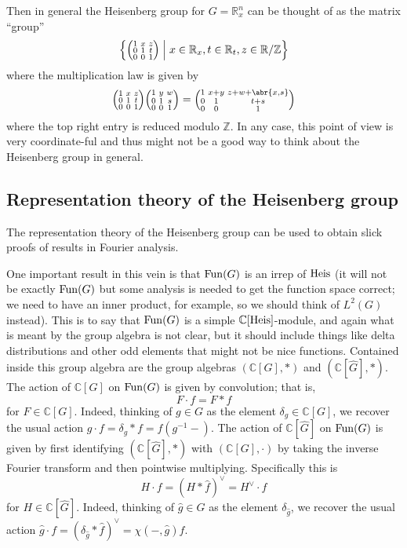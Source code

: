 \documentclass[../../rtnotes.tex]{subfiles}
\begin{document}
Then in general the Heisenberg group for $G = \mathbb R_x^n$ can be thought of as the matrix ``group''
\[\Bigl\{\Bigl(\!\begin{smallmatrix}
    1 & x & z\\
    0 & 1 & t\\
    0 & 0 & 1
\end{smallmatrix}\!\Bigr)\Bigm\vert x\in\mathbb R_x,t\in\mathbb R_t, z\in\mathbb R/\mathbb Z\Bigr\}\] where the multiplication law is given by
\[\Bigl(\!\begin{smallmatrix}
    1 & x & z\\
    0 & 1 & t\\
    0 & 0 & 1
\end{smallmatrix}\!\Bigr)\Bigl(\!\begin{smallmatrix}
    1 & y & w\\
    0 & 1 & s\\
    0 & 0 & 1
\end{smallmatrix}\!\Bigr) = \Bigl(\!\begin{smallmatrix}
    1 & x+y & z+w+\abr{x,s}\\
    0 & 1 & t+s\\
    0 & 0 & 1
\end{smallmatrix}\!\Bigr)\]
where the top right entry is reduced modulo $\mathbb Z$. In any case, this point of view is very coordinate-ful and thus might not be a good way to think about the Heisenberg group in general.

\subsection{Representation theory of the Heisenberg group}
The representation theory of the Heisenberg group can be used to obtain slick proofs of results in Fourier analysis.

One important result in this vein is that $\operatorname{Fun}(G)$ is an irrep of $\operatorname{Heis}$ (it will not be exactly $\operatorname{Fun}(G)$ but some analysis is needed to get the function space correct; we need to have an inner product, for example, so we should think of $L^2(G)$ instead). This is to say that $\operatorname{Fun}(G)$ is a simple $\mathbb C[\operatorname{Heis}]$-module, and again what is meant by the group algebra is not clear, but it should include things like delta distributions and other odd elements that might not be nice functions. Contained inside this group algebra are the group algebras $(\mathbb C[G],\ast)$ and $(\mathbb C[\widehat G],\ast)$. The action of $\mathbb C[G]$ on $\operatorname{Fun}(G)$ is given by convolution; that is,
\[F\cdot f = F\ast f\]
for $F\in\mathbb C[G]$. Indeed, thinking of $g\in G$ as the element $\delta_g\in \mathbb C[G]$, we recover the usual action $g\cdot f = \delta_g\ast f = f(g^{-1}-)$. The action of $\mathbb C[\widehat G]$ on $\operatorname{Fun}(G)$ is given by first identifying $(\mathbb C[\widehat G],\ast)$ with $(\mathbb C[G],\cdot)$ by taking the inverse Fourier transform and then pointwise multiplying. Specifically this is
\[H\cdot f = (H\ast \hat f)^\vee = H^\vee \cdot f\]
for $H\in\mathbb C[\widehat G]$. Indeed, thinking of $\hat g\in \widehat G$ as the element $\delta_{\hat g}$, we recover the usual action $\hat g\cdot f = (\delta_{\hat g}\ast \hat f)^\vee = \chi(-,\hat g)f$.
\end{document}
